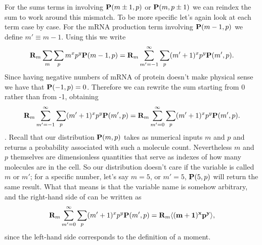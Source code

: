 For the sums terms in  involving $\mathbf{P}(m \pm 1, p)$ or
$\mathbf{P}(m, p \pm 1)$ we can reindex the sum to work around this mismatch. To be
more specific let's again look at each term case by case. For the mRNA
production term involving $\mathbf{P}(m-1, p)$ we define $m' \equiv m - 1$. Using this
we write
\begin{equation}
  \mathbf{R}_m \sum_m \sum_p m^x p^y \mathbf{P}(m-1, p) =
  \mathbf{R}_m \sum_{m' = -1}^\infty \sum_p (m' + 1)^x p^y \mathbf{P}(m', p).
\end{equation}
Since having negative numbers of mRNA of protein doesn't make physical sense
we have that $\mathbf{P}(-1, p) = 0$. Therefore we can rewrite the sum starting from 0
rather than from -1, obtaining
\begin{equation}
  \mathbf{R}_m \sum_{m' = -1}^\infty \sum_p (m' + 1)^x p^y \mathbf{P}(m', p) =
  \mathbf{R}_m \sum_{m'=0}^\infty \sum_p (m' + 1)^x p^y \mathbf{P}(m', p).
  \label{seq_reindex}
\end{equation}
.
Recall that our distribution $\mathbf{P}(m, p)$ takes as numerical inputs $m$ and $p$
and returns a probability associated with such a molecule count.  Nevertheless
$m$ and $p$ themselves are dimensionless quantities that serve as indexes of how
many molecules are in the cell. So our distribution doesn't care if the variable
is called $m$ or $m'$; for a specific number, let's say $m = 5$, or $m' = 5$,
$\mathbf{P}(5, p)$ will return the same result. What that means is that the variable
name is somehow arbitrary, and the right-hand side of  can be
written as
\begin{equation}
  \mathbf{R}_m \sum_{m'=0}^\infty \sum_p (m' + 1)^x p^y \mathbf{P}(m', p) =
  \mathbf{R}_m \mathbf{\left\langle (m+1)^x p^y \right\rangle},
\end{equation}
since the left-hand side corresponds to the definition of a moment.

